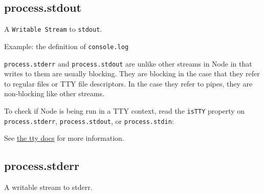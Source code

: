 \subsection{process.stdout}\label{process.stdout}

A \texttt{Writable Stream} to \texttt{stdout}.

Example: the definition of \texttt{console.log}

\begin{Shaded}
\begin{Highlighting}[]
 \NormalTok{= }
  \NormalTok{);}
\NormalTok{\};}
\end{Highlighting}
\end{Shaded}

\texttt{process.stderr} and \texttt{process.stdout} are unlike other
streams in Node in that writes to them are usually blocking. They are
blocking in the case that they refer to regular files or TTY file
descriptors. In the case they refer to pipes, they are non-blocking like
other streams.

To check if Node is being run in a TTY context, read the \texttt{isTTY}
property on \texttt{process.stderr}, \texttt{process.stdout}, or
\texttt{process.stdin}:

\begin{Shaded}
\begin{Highlighting}[]
 

 
\end{Highlighting}
\end{Shaded}

See \href{tty.html\#tty_tty}{the tty docs} for more information.

\subsection{process.stderr}\label{process.stderr}

A writable stream to stderr.

